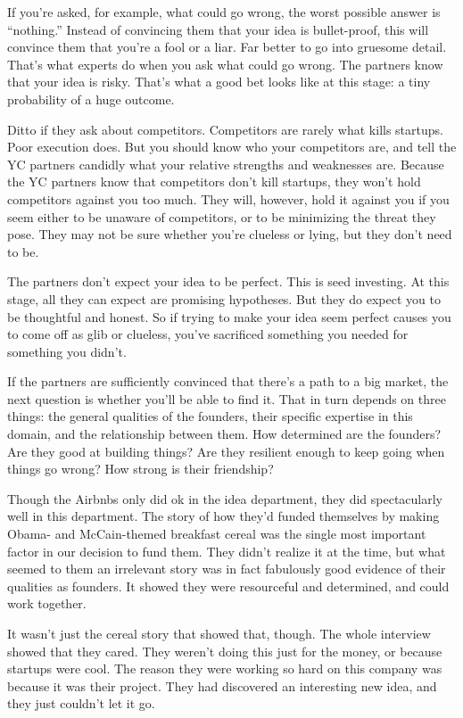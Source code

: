 If you're asked, for example, what could go wrong, the worst possible
answer is ``nothing.'' Instead of convincing them that your idea is
bullet-proof, this will convince them that you're a fool or a liar. Far
better to go into gruesome detail. That's what experts do when you ask
what could go wrong. The partners know that your idea is risky. That's
what a good bet looks like at this stage: a tiny probability of a huge
outcome.

Ditto if they ask about competitors. Competitors are rarely what kills
startups. Poor execution does. But you should know who your competitors
are, and tell the YC partners candidly what your relative strengths and
weaknesses are. Because the YC partners know that competitors don't kill
startups, they won't hold competitors against you too much. They will,
however, hold it against you if you seem either to be unaware of
competitors, or to be minimizing the threat they pose. They may not be
sure whether you're clueless or lying, but they don't need to be.

The partners don't expect your idea to be perfect. This is seed
investing. At this stage, all they can expect are promising hypotheses.
But they do expect you to be thoughtful and honest. So if trying to make
your idea seem perfect causes you to come off as glib or clueless,
you've sacrificed something you needed for something you didn't.

If the partners are sufficiently convinced that there's a path to a big
market, the next question is whether you'll be able to find it. That in
turn depends on three things: the general qualities of the founders,
their specific expertise in this domain, and the relationship between
them. How determined are the founders? Are they good at building things?
Are they resilient enough to keep going when things go wrong? How strong
is their friendship?

Though the Airbnbs only did ok in the idea department, they did
spectacularly well in this department. The story of how they'd funded
themselves by making Obama- and McCain-themed breakfast cereal was the
single most important factor in our decision to fund them. They didn't
realize it at the time, but what seemed to them an irrelevant story was
in fact fabulously good evidence of their qualities as founders. It
showed they were resourceful and determined, and could work together.

It wasn't just the cereal story that showed that, though. The whole
interview showed that they cared. They weren't doing this just for the
money, or because startups were cool. The reason they were working so
hard on this company was because it was their project. They had
discovered an interesting new idea, and they just couldn't let it go.

